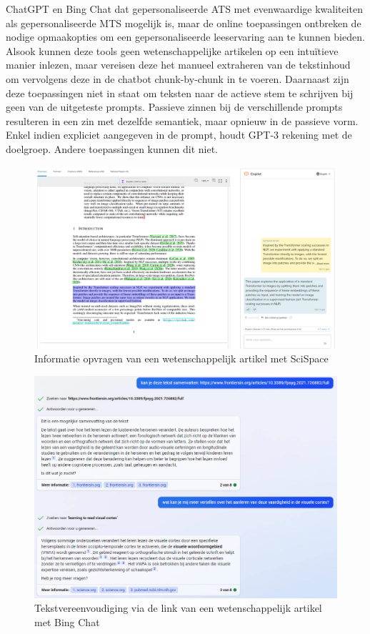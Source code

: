 ChatGPT en Bing Chat dat gepersonaliseerde ATS met evenwaardige kwaliteiten als gepersonaliseerde MTS mogelijk is, maar de online toepassingen ontbreken de nodige opmaakopties om een gepersonaliseerde leeservaring aan te kunnen bieden. Alsook kunnen deze tools geen wetenschappelijke artikelen op een intuïtieve manier inlezen, maar vereisen deze het manueel extraheren van de tekstinhoud om vervolgens deze in de chatbot chunk-by-chunk in te voeren. Daarnaast zijn deze toepassingen niet in staat om teksten naar de actieve stem te schrijven bij geen van de uitgeteste prompts. Passieve zinnen bij de verschillende prompts resulteren in een zin met dezelfde semantiek, maar opnieuw in de passieve vorm. Enkel indien expliciet aangegeven in de prompt, houdt GPT-3 rekening met de doelgroep. Andere toepassingen kunnen dit niet.

\begin{figure}[H]
	\includegraphics{img/typeset-example.png}
	\caption{Informatie opvragen van een wetenschappelijk artikel met SciSpace}
	\label{img:scispace-example}
\end{figure}

\begin{figure}[H]
	\includegraphics{img/bing-ai-chatbot-example.png}
	\caption{Tekstvereenvoudiging via de link van een wetenschappelijk artikel met Bing Chat}
	\label{img:tryout-bing-ai}
\end{figure}

